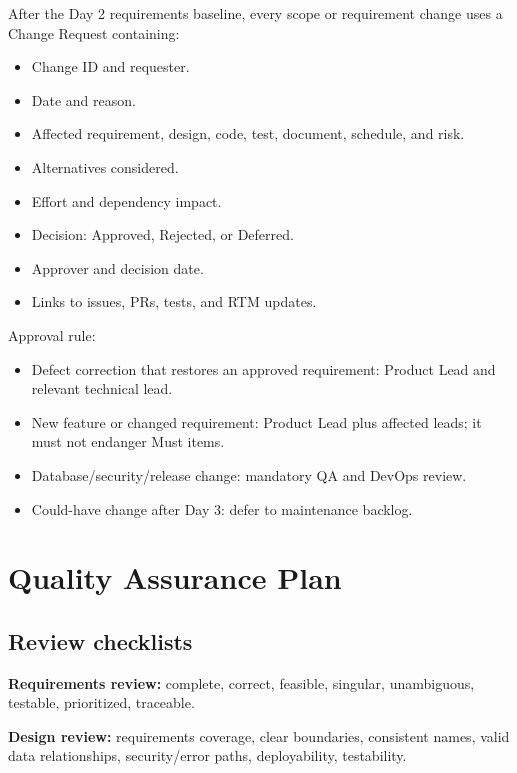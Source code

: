 \documentclass[
  10pt,
  a4paper,
  oneside]{report}
\providecommand{\tightlist}{%
  \setlength{\itemsep}{0pt}\setlength{\parskip}{0pt}}
\begin{document}
After the Day 2 requirements baseline, every scope or requirement change
uses a Change Request containing:

\begin{itemize}
\tightlist
\item
  Change ID and requester.
\item
  Date and reason.
\item
  Affected requirement, design, code, test, document, schedule, and
  risk.
\item
  Alternatives considered.
\item
  Effort and dependency impact.
\item
  Decision: Approved, Rejected, or Deferred.
\item
  Approver and decision date.
\item
  Links to issues, PRs, tests, and RTM updates.
\end{itemize}

Approval rule:

\begin{itemize}
\tightlist
\item
  Defect correction that restores an approved requirement: Product Lead
  and relevant technical lead.
\item
  New feature or changed requirement: Product Lead plus affected leads;
  it must not endanger Must items.
\item
  Database/security/release change: mandatory QA and DevOps review.
\item
  Could-have change after Day 3: defer to maintenance backlog.
\end{itemize}

\chapter{Quality Assurance Plan}\label{21-quality-assurance-plan}

\section{Review checklists}\label{211-review-checklists}

\textbf{Requirements review:} complete, correct, feasible, singular,
unambiguous, testable, prioritized, traceable.

\textbf{Design review:} requirements coverage, clear boundaries,
consistent names, valid data relationships, security/error paths,
deployability, testability.
\end{document}

